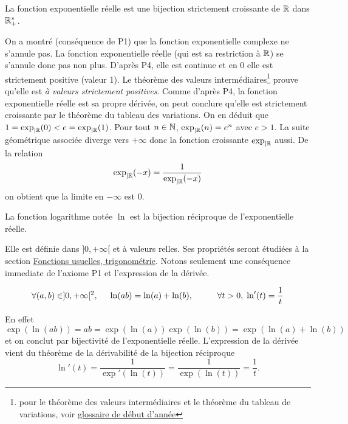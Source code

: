 \begin{propn}
 La fonction exponentielle réelle est une bijection strictement croissante de $\mathbb{R}$ dans $\mathbb{R}_+^*$.
\end{propn}
\begin{demo}
 On a montré (conséquence de P1) que la fonction exponentielle complexe ne s'annule pas. La fonction exponentielle réelle (qui est sa restriction à $\mathbb{R}$) se s'annule donc pas non plus. D'après P4, elle est continue et en $0$ elle est strictement positive (valeur 1). Le théorème des valeurs intermédiaires\footnote{pour le théorème des valeurs intermédiaires et le théorème du tableau de variations, voir \href{\baseurl C4199.pdf}{glossaire de début d'année}} prouve qu'elle est \emph{à valeurs strictement positives}. Comme d'après P4, la fonction exponentielle réelle est sa propre dérivée, on peut conclure qu'elle est strictement croissante par le théorème du tableau des variations.\newline
 On en déduit que $1=\exp_{|\mathbb{R}}(0) < e =\exp_{|\mathbb{R}}(1)$. Pour tout $n\in \mathbb{N}$, $\exp_{|\mathbb{R}}(n) = e^{n}$ avec $e>1$. La suite géométrique associée diverge vers $+\infty$ donc la fonction croissante $\exp_{|\mathbb{R}}$ aussi. De la relation 
 \begin{displaymath}
   \exp_{|\mathbb{R}}(-x) = \frac{1}{\exp_{|\mathbb{R}}(-x)}
 \end{displaymath}
on obtient que la limite en $-\infty$ est $0$.
\end{demo}
\begin{defi}
  La fonction logarithme notée $\ln$ est la bijection réciproque de l'exponentielle réelle.
\end{defi}
Elle est définie dans $]0,+\infty[$ et à valeurs relles. Ses propriétés seront étudiées à la section \href{\baseurl C2004.pdf}{Fonctions usuelles, trigonométrie}. Notons seulement une conséquence immediate de l'axiome P1 et l'expression de la dérivée.
\begin{propn}
\begin{displaymath}
  \forall(a,b)\in ]0,+\infty[^2,\hspace{0.5cm} \ln(ab) =\ln(a) + \ln(b), \hspace{1cm}
  \forall t>0,\; \ln'(t) = \frac{1}{t}
\end{displaymath} 
\end{propn}
\begin{demo}
  En effet
\begin{displaymath}
  \exp(\ln(ab)) = ab = \exp(\ln(a))\exp(\ln(b)) = \exp(\ln(a) + \ln(b))
\end{displaymath}
et on conclut par bijectivité de l'exponentielle réelle. L'expression de la dérivée vient du théorème de la dérivabilité de la bijection réciproque
\begin{displaymath}
 \ln'(t) = \frac{1}{\exp'(\ln(t))} = \frac{1}{\exp(\ln(t))} = \frac{1}{t}. 
\end{displaymath}
\end{demo}

